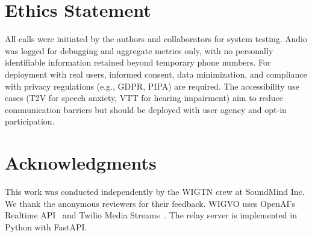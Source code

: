 \documentclass[11pt]{article}
\begin{document}
\section*{Ethics Statement}

All calls were initiated by the authors and collaborators for system testing. Audio was logged for debugging and aggregate metrics only, with no personally identifiable information retained beyond temporary phone numbers. For deployment with real users, informed consent, data minimization, and compliance with privacy regulations (e.g., GDPR, PIPA) are required. The accessibility use cases (T2V for speech anxiety, VTT for hearing impairment) aim to reduce communication barriers but should be deployed with user agency and opt-in participation.

\section*{Acknowledgments}

This work was conducted independently by the WIGTN crew at SoundMind Inc. We thank the anonymous reviewers for their feedback. WIGVO uses OpenAI's Realtime API~\citep{openai_realtime_api_2024} and Twilio Media Streams~\citep{twilio_media_streams_2024}. The relay server is implemented in Python with FastAPI.



\end{document}
